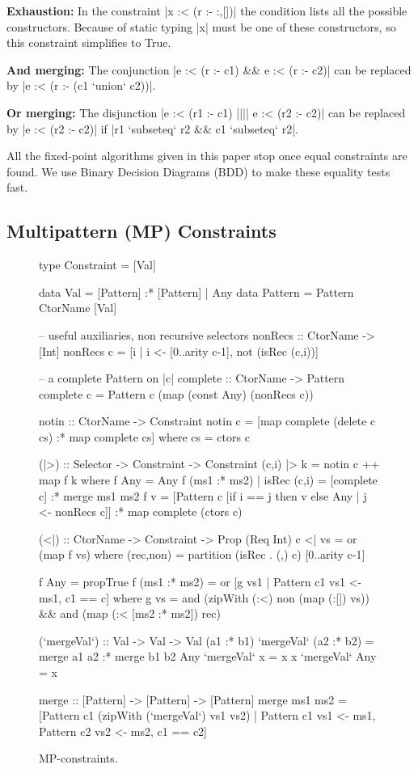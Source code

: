 \documentclass[preprint]{sigplanconf}
\newcommand{\para}[1]{\vspace{2mm}\noindent\textbf{#1}}
\begin{document}
\para{Exhaustion:} In the constraint |x :< (r :- {:,[]})| the condition lists all the possible constructors. Because of static typing |x| must be one of these constructors, so this constraint simplifies to True.

\para{And merging:} The conjunction |e :< (r :- c1) && e :< (r :- c2)| can be replaced by |e :< (r :- (c1 `union` c2))|.

\para{Or merging:} The disjunction |e :< (r1 :- c1) |||| e :< (r2 :- c2)| can be replaced by |e :< (r2 :- c2)| if |r1 `subseteq` r2 && c1 `subseteq` r2|.

All the fixed-point algorithms given in this paper stop once equal constraints are found. We use Binary Decision Diagrams (BDD) \citep{lee:bdd} to make these equality tests fast.

\subsection{Multipattern (MP) Constraints}
\label{sec:multipattern}

\begin{figure}
\begin{code}
type Constraint = [Val]

data Val      =  [Pattern] :* [Pattern]
              |  Any
data Pattern  =  Pattern CtorName [Val]

-- useful auxiliaries, non recursive selectors
nonRecs :: CtorName -> [Int]
nonRecs c = [i | i <- [0..arity c-1], not (isRec (c,i))]

-- a complete Pattern on |c|
complete :: CtorName -> Pattern
complete c = Pattern c (map (const Any) (nonRecs c))

notin :: CtorName -> Constraint
notin c = [map complete (delete c cs) :* map complete cs]
    where cs = ctors c

(|>) :: Selector -> Constraint -> Constraint
(c,i) |> k = notin c ++ map f k
    where
    f Any = Any
    f (ms1 :* ms2) | isRec (c,i) = [complete c] :* merge ms1 ms2
    f v =  [Pattern c [if i == j then v else Any | j <- nonRecs c]]
           :* map complete (ctors c)

(<|) :: CtorName -> Constraint -> Prop (Req Int)
c <| vs = or (map f vs)
    where
    (rec,non) = partition (isRec . (,) c) [0..arity c-1]

    f Any = propTrue
    f (ms1 :* ms2) = or [g vs1 | Pattern c1 vs1 <- ms1, c1 == c]
        where g vs =  and (zipWith (:<) non (map (:[]) vs)) &&
                      and (map (:< [ms2 :* ms2]) rec)

(`mergeVal`) :: Val -> Val -> Val
(a1 :* b1) `mergeVal` (a2 :* b2)  = merge a1 a2 :* merge b1 b2
Any        `mergeVal` x           = x
x          `mergeVal` Any         = x

merge :: [Pattern] -> [Pattern] -> [Pattern]
merge  ms1 ms2 = [Pattern c1 (zipWith (`mergeVal`) vs1 vs2) |
       Pattern c1 vs1 <- ms1, Pattern c2 vs2 <- ms2, c1 == c2]
\end{code}
\caption{MP-constraints.}
\label{fig:enumeration}
\end{figure}
\end{document}
